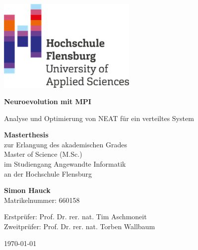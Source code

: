 \documentclass[12pt,a4paper]{scrreprt}
\begin{document}
\begin{titlepage}
	\begin{center}
		\includegraphics[width=0.50\textwidth]{img/hs_logo.png}\par\vspace{0cm}
		\vspace{1.5cm}
		{\huge\bfseries Neuroevolution mit MPI \par}
		\vspace{0.5cm}
		{\LARGE Analyse und Optimierung von NEAT für ein verteiltes System\par}
		\vspace{2cm}
	\end{center}

	\begin{large}
		\noindent
		\textbf{Masterthesis}\\
		zur Erlangung des akademischen Grades\\
		Master of Science (M.Sc.)\\
		im Studiengang Angewandte Informatik\\
		an der Hochschule Flensburg
		\vspace{1cm}
	\end{large}
	
	\begin{large}
		\noindent
		\textbf{Simon Hauck}\\
		Matrikelnummer: 660158
		\vspace{1.0cm}
	\end{large}
	
	\begin{large}
		\noindent
		Erstprüfer: \hspace{1.0cm} Prof. Dr. rer. nat. Tim Aschmoneit \\
		Zweitprüfer: \hspace{0.7cm} Prof. Dr. rer. nat. Torben Wallbaum \\
	\end{large}
	\vspace{1.5cm}

	{\large \centering \today\par}
\end{titlepage}
\end{document}
